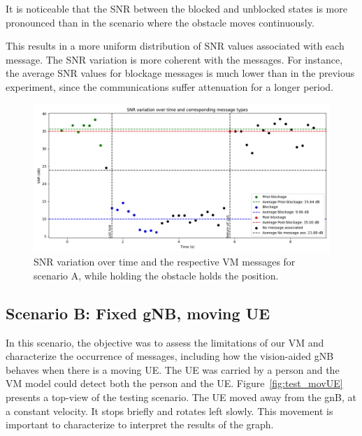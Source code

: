 It is noticeable that the SNR between the blocked and unblocked states is more pronounced than in the scenario where the obstacle moves continuously.

This results in a more uniform distribution of SNR values associated with each message.
The SNR variation is more coherent with the messages.
For instance, the average SNR values for blockage messages is much lower than in the previous experiment, since the communications suffer attenuation for a longer period.


\begin{figure}[H]
    \centering
    \includegraphics[width=\linewidth]{figures/results_01}
    \caption{SNR variation over time and the respective VM messages for scenario A, while holding the obstacle holds the position.}
    \label{fig:results_01}
\end{figure}


\subsection{Scenario B: Fixed gNB, moving UE}\label{subsec:scenario-0.1:-fixed-gnb-moving-ue}

In this scenario, the objective was to assess the limitations of our VM and characterize the occurrence of messages, including how the vision-aided gNB behaves when there is a moving UE\@.
The UE was carried by a person and the VM model could detect both the person and the UE\@.
Figure~\ref{fig:test_movUE} presents a top-view of the testing scenario.
The UE moved away from the gnB, at a constant velocity.
It stops briefly and rotates left slowly.
This movement is important to characterize to interpret the results of the graph.

